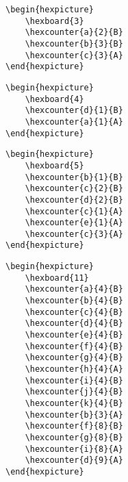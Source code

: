 \documentclass[a4paper,12pt]{article}
\begin{document}
    \begin{verbatim}\begin{hexpicture}
    \hexboard{3}
    \hexcounter{a}{2}{B}
    \hexcounter{b}{3}{B}
    \hexcounter{c}{3}{A}
\end{hexpicture}\end{verbatim}

    \begin{hexpicture}
    \end{hexpicture}

    \begin{verbatim}\begin{hexpicture}
    \hexboard{4}
    \hexcounter{d}{1}{B}
    \hexcounter{a}{1}{A}
\end{hexpicture}\end{verbatim}

    \begin{hexpicture}
    \end{hexpicture}

    \begin{verbatim}\begin{hexpicture}
    \hexboard{5}
    \hexcounter{b}{1}{B}
    \hexcounter{c}{2}{B}
    \hexcounter{d}{2}{B}
    \hexcounter{c}{1}{A}
    \hexcounter{e}{1}{A}
    \hexcounter{c}{3}{A}
\end{hexpicture}\end{verbatim}

    \begin{hexpicture}
    \end{hexpicture}

    \begin{verbatim}\begin{hexpicture}
    \hexboard{11}
    \hexcounter{a}{4}{B}
    \hexcounter{b}{4}{B}
    \hexcounter{c}{4}{B}
    \hexcounter{d}{4}{B}
    \hexcounter{e}{4}{B}
    \hexcounter{f}{4}{B}
    \hexcounter{g}{4}{B}
    \hexcounter{h}{4}{A}
    \hexcounter{i}{4}{B}
    \hexcounter{j}{4}{B}
    \hexcounter{k}{4}{B}
    \hexcounter{b}{3}{A}
    \hexcounter{f}{8}{B}
    \hexcounter{g}{8}{B}
    \hexcounter{i}{8}{A}
    \hexcounter{d}{9}{A}
\end{hexpicture}\end{verbatim}
\end{document}

